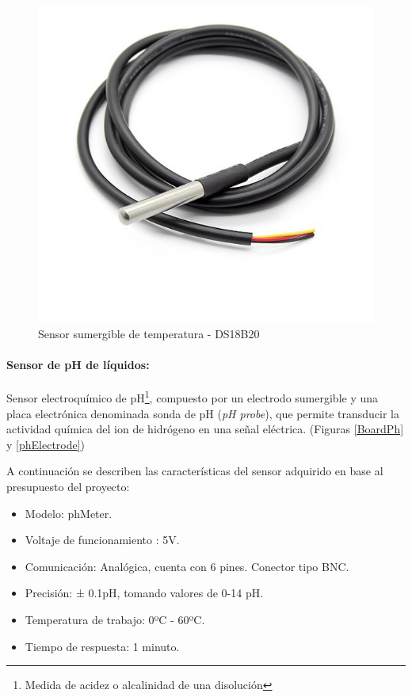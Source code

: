                 \begin{figure}
                    \centering
                    \includegraphics[scale=0.25]{hardware/ds18b20.jpg}
                    \caption{Sensor sumergible de temperatura - DS18B20}
                    \label{SensorTemp}
                \end{figure}
                
            \paragraph{Sensor de pH de líquidos:}Sensor electroquímico de pH\footnote{ Medida de acidez o alcalinidad de una disolución}, compuesto por un electrodo sumergible y una placa electrónica denominada sonda de pH (\textit{pH probe}), que permite transducir la actividad química del ion de hidrógeno en una señal eléctrica. (Figuras \ref{BoardPh} y \ref{phElectrode})
                
                \par A continuación se describen las características del sensor adquirido en base al presupuesto del proyecto:
                
                \begin{itemize}
                    \item Modelo: phMeter.
                    \item Voltaje de funcionamiento : 5V.
                    \item Comunicación: Analógica, cuenta con 6 pines. Conector tipo BNC.
                    \item Precisión: ± 0.1pH, tomando valores de 0-14 pH.
                    \item Temperatura de trabajo: 0ºC - 60ºC.
                    \item Tiempo de respuesta: 1 minuto.
                \end{itemize}
                
